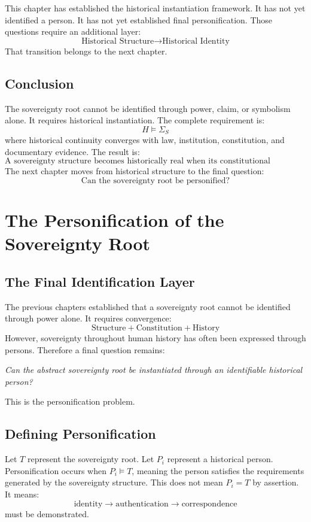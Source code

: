 \documentclass[11pt,openany]{book}
\theoremstyle{plain}
\theoremstyle{definition}
\begin{document}
This chapter has established the historical instantiation framework. It has not yet identified a person. It has not yet established final personification. Those questions require an additional layer:
\[
\text{Historical Structure} \longrightarrow \text{Historical Identity}
\]
That transition belongs to the next chapter.

\section{Conclusion}

The sovereignty root cannot be identified through power, claim, or symbolism alone. It requires historical instantiation. The complete requirement is:
\[
\boxed{
H \models \Sigma_S
}
\]
where historical continuity converges with law, institution, constitution, and documentary evidence. The result is:
\[
\boxed{
\text{A sovereignty structure becomes historically real when its constitutional signature is continuously instantiated through time.}
}
\]
The next chapter moves from historical structure to the final question:
\[
\boxed{
\text{Can the sovereignty root be personified?}
}
\]

\chapter{The Personification of the Sovereignty Root}

\section{The Final Identification Layer}

The previous chapters established that a sovereignty root cannot be identified through power alone. It requires convergence:
\[
\text{Structure} + \text{Constitution} + \text{History}
\]
However, sovereignty throughout human history has often been expressed through persons. Therefore a final question remains:
\begin{center}
\textit{
Can the abstract sovereignty root be instantiated through an identifiable historical person?
}
\end{center}
This is the personification problem.

\section{Defining Personification}

Let \(T\) represent the sovereignty root. Let \(P_i\) represent a historical person. Personification occurs when \(P_i \models T\), meaning the person satisfies the requirements generated by the sovereignty structure. This does not mean \(P_i = T\) by assertion. It means:
\[
\text{identity} \longrightarrow \text{authentication} \longrightarrow \text{correspondence}
\]
must be demonstrated.
\end{document}
